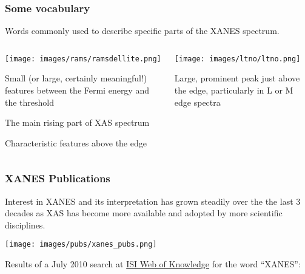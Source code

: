 \documentclass[10pt, xcolor=x11names, compress]{beamer}
\begin{document}
\begin{frame}
  \frametitle{Some vocabulary}

  Words commonly used to describe specific parts of the XANES spectrum.

  \begin{columns}[T]
    \begin{column}{0.5\linewidth}
      \texttt{[image: images/rams/ramsdellite.png]}

      \small

      \begin{description}[edge]
      \item[{\color{red}pre-edge}] Small (or large, certainly
        meaningful!) features between the Fermi energy and the
        threshold
      \item[{\color{DarkOrchid2}edge}] The main rising part of XAS spectrum
      \item[{\color{Green4}near-edge}] Characteristic features above the edge
      \end{description}
    \end{column}    
    \begin{column}{0.5\linewidth}
      \texttt{[image: images/ltno/ltno.png]}

      \begin{description}[wh]
      \item[{\color{Blue3}white line}] Large, prominent peak just
        above the edge, particularly in L or M edge spectra
      \end{description}
    \end{column}    
  \end{columns}
\end{frame}

\begin{frame}
  \frametitle{XANES Publications}

  Interest in XANES and its interpretation has grown steadily over the
  the last 3 decades as XAS has become more available and adopted by
  more scientific disciplines.

  \begin{center}
    \texttt{[image: images/pubs/xanes\_pubs.png]}

    \tiny Results of a July 2010 search at
    \href{http://pcs.isiknowledge.com/} {\color{Blue4}ISI Web of
      Knowledge} for the word ``XANES'':
  \end{center}
\end{frame}
\end{document}
